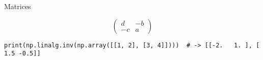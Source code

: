 \begin{frame}[fragile]{Matrices}
\begin{itemize}
\begin{itemize}
\begin{equation*}
                \begin{pmatrix} d & -b \\ -c & a \end{pmatrix}
            \end{equation*}
        \end{itemize}
    \end{itemize}
    \begin{mdframed}
      \begin{lstlisting}[style=dark, gobble=6, title=\lsttitlelight{Matrices in numpy -- Examples for presented content}]
      print(np.linalg.inv(np.array([[1, 2], [3, 4]])))  # -> [[-2.   1. ], [ 1.5 -0.5]]
      \end{lstlisting}
    \end{mdframed}
  \end{frame}

